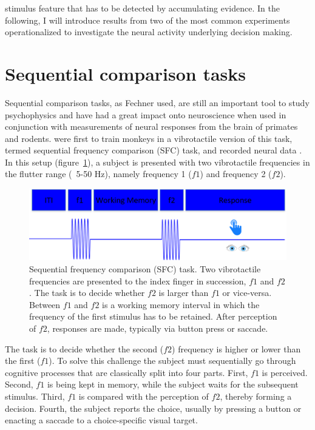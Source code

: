 stimulus feature that has to be detected by accumulating evidence. In the following, I will introduce results from two of the most common experiments operationalized to investigate the neural activity underlying decision making. 

\section{Sequential comparison tasks}
Sequential comparison tasks, as Fechner used, are still an important tool to study psychophysics and have had a great impact onto neuroscience when used in conjunction with measurements of neural responses from the brain of primates and rodents. \textcite{Mountcastle1969} were first to train monkeys in a vibrotactile version of this task, termed sequential frequency comparison (SFC) task, and recorded neural data \parencite{Mountcastle1967,Mountcastle1990}.
In this setup (figure~\ref{fig:SFCtask}), a subject is presented with two vibrotactile frequencies in the flutter range (~5-50 Hz), namely frequency 1 ($f1$) and frequency 2 ($f2$).
\begin{figure}[t]
\centering
\includegraphics[width=1\textwidth]{figures/SFC_task.png}
\caption{Sequential frequency comparison (SFC) task. Two vibrotactile frequencies are presented to the index finger in succession, $f1$ and $f2$. The task is to decide whether $f2$ is larger than $f1$ or vice-versa. Between $f1$ and $f2$ is a working memory interval in which the frequency of the first stimulus has to be retained. After perception of $f2$, responses are made, typically via button press or saccade.}
\label{fig:SFCtask}
\end{figure}
The task is to decide whether the second ($f2$) frequency is higher or lower than the first ($f1$). To solve this challenge the subject must sequentially go through cognitive processes that are classically split into four parts. First, $f1$ is perceived. Second, $f1$ is being kept in memory, while the subject waits for the subsequent stimulus. Third, $f1$ is compared with the perception of $f2$, thereby forming a decision.  Fourth, the subject reports the choice, usually by pressing a button or enacting a saccade to a choice-specific visual target.
